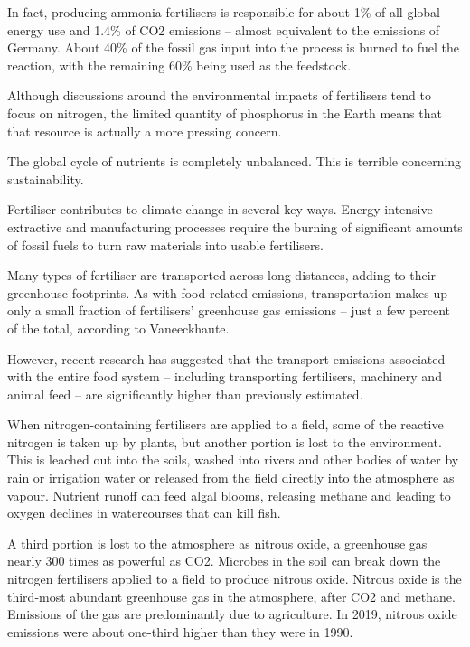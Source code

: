 \documentclass[
]{book}
\begin{document}
In fact, producing ammonia fertilisers is responsible for about 1\% of all global energy use and 1.4\% of CO2 emissions -- almost equivalent to the emissions of Germany. About 40\% of the fossil gas input into the process is burned to fuel the reaction, with the remaining 60\% being used as the feedstock.

Although discussions around the environmental impacts of fertilisers tend to focus on nitrogen, the limited quantity of phosphorus in the Earth means that that resource is actually a more pressing concern.

The global cycle of nutrients is completely unbalanced. This is terrible concerning sustainability.

Fertiliser contributes to climate change in several key ways. Energy-intensive extractive and manufacturing processes require the burning of significant amounts of fossil fuels to turn raw materials into usable fertilisers.

Many types of fertiliser are transported across long distances, adding to their greenhouse footprints. As with food-related emissions, transportation makes up only a small fraction of fertilisers' greenhouse gas emissions -- just a few percent of the total, according to Vaneeckhaute.

However, recent research has suggested that the transport emissions associated with the entire food system -- including transporting fertilisers, machinery and animal feed -- are significantly higher than previously estimated.

When nitrogen-containing fertilisers are applied to a field, some of the reactive nitrogen is taken up by plants, but another portion is lost to the environment. This is leached out into the soils, washed into rivers and other bodies of water by rain or irrigation water or released from the field directly into the atmosphere as vapour. Nutrient runoff can feed algal blooms, releasing methane and leading to oxygen declines in watercourses that can kill fish.

A third portion is lost to the atmosphere as nitrous oxide, a greenhouse gas nearly 300 times as powerful as CO2. Microbes in the soil can break down the nitrogen fertilisers applied to a field to produce nitrous oxide. Nitrous oxide is the third-most abundant greenhouse gas in the atmosphere, after CO2 and methane. Emissions of the gas are predominantly due to agriculture. In 2019, nitrous oxide emissions were about one-third higher than they were in 1990.
\end{document}
